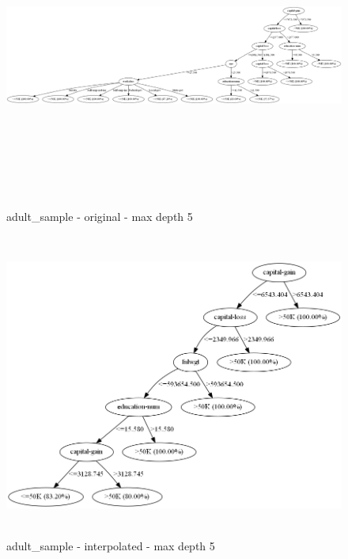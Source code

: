 \documentclass{sig-alternate}
\begin{document}
\clearpage
\begin{figure}[!t]
    \centering
    \includegraphics[width=1.00\textwidth,height=10cm,keepaspectratio]{./images/adultSampleD5Original.png}
    \caption{adult\_sample - original - max depth 5}
    \label{figure:adultSampleD5Original}
\end{figure}
\begin{figure}[h]
    \centering
    \includegraphics[width=1.00\textwidth,height=10cm,keepaspectratio]{./images/adultSampleD5New.png}
    \caption{adult\_sample - interpolated - max depth 5}
    \label{figure:adultSampleD5New}
\end{figure}
\end{document}

